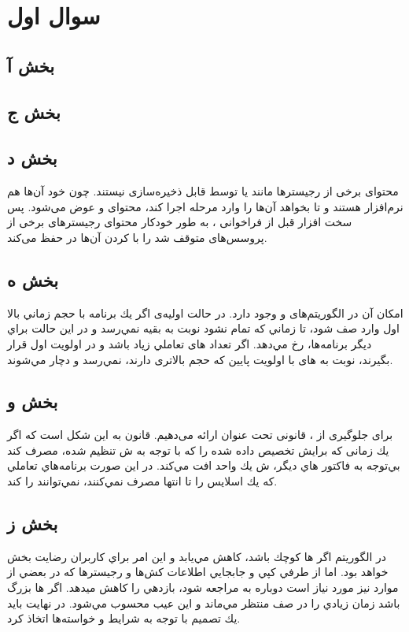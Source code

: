 \documentclass{article}
\begin{document}


\tableofcontents
\newpage

\section{سوال اول}

\subsection{بخش آ}

\subsection{بخش ج}

\subsection{بخش د}
محتوای برخی از رجیستر‌ها مانند  یا  توسط  قابل ذخیره‌سازی نیستند. چون خود آن‌ها هم نرم‌افزار هستند و تا  بخواهد آن‌ها را وارد مرحله اجرا کند، محتوای  و  عوض می‌شود. پس سخت افزار قبل از فراخوانی  ، به طور خودکار محتوای رجیستر‌های برخی از پروسس‌های متوقف شد را با  کردن آن‌ها در  حفظ می‌کند.
\subsection{بخش ه}
امکان آن در الگوریتم‌های  و  وجود دارد. در حالت اولیه‌ی  اگر يك برنامه با حجم زماني بالا اول وارد صف شود، تا زماني كه تمام نشود نوبت به بقيه نمي‌رسد و در اين حالت براي ديگر برنامه‌ها،  رخ مي‌دهد. اگر تعداد های تعاملي زياد باشد و در اولويت اول قرار بگيرند، نوبت به های با اولويت پايين كه حجم بالاتری دارند، نمي‌رسد و دچار  مي‌شوند.
\subsection{بخش و}
برای جلوگیری از ، قانونی تحت عنوان  ارائه می‌دهیم. قانون به این شکل است که اگر يك  زمانی كه برايش تخصيص داده شده را كه با توجه به ش تنظيم شده، مصرف كند بي‌توجه به فاكتور هاي ديگر، ش يك واحد افت مي‌كند. در اين صورت برنامه‌هاي تعاملي كه يك اسلايس را تا انتها مصرف نمي‌كنند، نمي‌توانند   را  کند.
\subsection{بخش ز}
در الگوريتم  اگر ها كوچك باشد،  کاهش مي‌يابد و اين امر براي كاربران رضايت بخش خواهد بود. اما از طرفي  كپي و جابجايي اطلاعات کش‌ها و  رجیسترها كه در بعضي از موارد نيز مورد نیاز است دوباره به  مراجعه شود، بازدهي را كاهش ميدهد. اگر  ها بزرگ باشد  زمان زيادي را در صف منتظر مي‌ماند و اين عيب محسوب مي‌شود. در نهايت بايد يك تصميم با توجه به شرايط و خواسته‌ها اتخاذ كرد.
\end{document}
